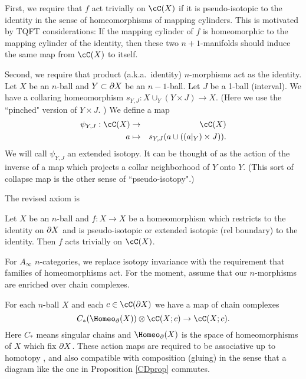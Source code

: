 First, we require that $f$ act trivially on $\cC(X)$ if it is pseudo-isotopic to the identity
in the sense of homeomorphisms of mapping cylinders.
This is motivated by TQFT considerations:
If the mapping cylinder of $f$ is homeomorphic to the mapping cylinder of the identity,
then these two $n{+}1$-manifolds should induce the same map from $\cC(X)$ to itself.

Second, we require that product (a.k.a.\ identity) $n$-morphisms act as the identity.
Let $X$ be an $n$-ball and $Y\subset\partial X$ be an $n{-}1$-ball.
Let $J$ be a 1-ball (interval).
We have a collaring homeomorphism $s_{Y,J}: X\cup_Y (Y\times J) \to X$.
(Here we use the ``pinched" version of $Y\times J$.
)
We define a map
\begin{eqnarray*}
	\psi_{Y,J}: \cC(X) &\to& \cC(X) \\
	a & \mapsto & s_{Y,J}(a \cup ((a|_Y)\times J)) .
\end{eqnarray*}
We will call $\psi_{Y,J}$ an extended isotopy.
It can be thought of as the action of the inverse of
a map which projects a collar neighborhood of $Y$ onto $Y$.
(This sort of collapse map is the other sense of ``pseudo-isotopy".)

The revised axiom is

{Let $X$ be an $n$-ball and $f: X\to X$ be a homeomorphism which restricts
to the identity on $\partial X$ and is pseudo-isotopic or extended isotopic (rel boundary) to the identity.
Then $f$ acts trivially on $\cC(X)$.}


\smallskip

For $A_\infty$ $n$-categories, we replace
isotopy invariance with the requirement that families of homeomorphisms act.
For the moment, assume that our $n$-morphisms are enriched over chain complexes.

{For each $n$-ball $X$ and each $c\in \cC(\bd X)$ we have a map of chain complexes
\[
	C_*(\Homeo_\bd(X))\ot \cC(X; c) \to \cC(X; c) .
\]
Here $C_*$ means singular chains and $\Homeo_\bd(X)$ is the space of homeomorphisms of $X$
which fix $\partial X$.
These action maps are required to be associative up to homotopy
, and also compatible with composition (gluing) in the sense that
a diagram like the one in Proposition \ref{CDprop} commutes.
}

